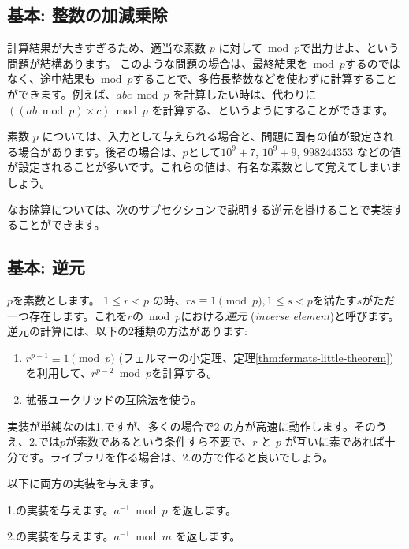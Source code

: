 \documentclass{jsarticle}
\begin{document}
  \subsection{基本: 整数の加減乗除}
  計算結果が大きすぎるため、適当な素数 $p$ に対して${} \bmod p$で出力せよ、という問題が結構あります。
  このような問題の場合は、最終結果を${} \bmod p$するのではなく、途中結果も${} \bmod p$することで、多倍長整数などを使わずに計算することができます。例えば、$abc \bmod p$ を計算したい時は、代わりに$((ab \bmod p) \times c) \bmod p$ を計算する、というようにすることができます。

  素数 $p$ については、入力として与えられる場合と、問題に固有の値が設定される場合があります。後者の場合は、$p$として$10^9 + 7$, $10^9 + 9$, $998244353$ などの値が設定されることが多いです。これらの値は、有名な素数として覚えてしまいましょう。

  なお除算については、次のサブセクションで説明する逆元を掛けることで実装することができます。
  \subsection{基本: 逆元}
  \label{subsec:inverse-element}
  $p$を素数とします。
  $1 \le r < p$ の時、$rs \equiv 1 \pmod p, 1 \le s < p$を満たす$s$がただ一つ存在します。これを$r$の${} \bmod p$における\emph{逆元} (\emph{inverse element})と呼びます。
  逆元の計算には、以下の2種類の方法があります:
  \begin{enumerate}
   \item $r^{p-1} \equiv 1 \pmod p$ (フェルマーの小定理、定理\ref{thm:fermats-little-theorem})を利用して、$r^{p-2} \bmod p$を計算する。
   \item 拡張ユークリッドの互除法を使う。
  \end{enumerate}
  実装が単純なのは1.ですが、多くの場合で2.の方が高速に動作します。そのうえ、2.では$p$が素数であるという条件すら不要で、$r$ と $p$ が互いに素であれば十分です。ライブラリを作る場合は、2.の方で作ると良いでしょう。

  以下に両方の実装を与えます。

  1.の実装を与えます。$a^{-1} \bmod p$ を返します。
  

  2.の実装を与えます。$a^{-1} \bmod m$ を返します。
  
\end{document}
